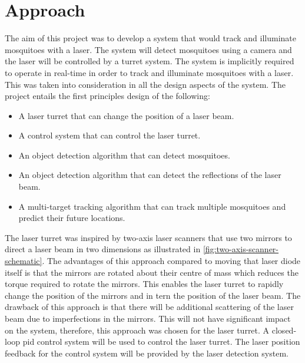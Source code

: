 
\section{Approach}
The aim of this project was to develop a system that would track and  illuminate mosquitoes with a laser. The system will detect mosquitoes using a camera and the laser will be controlled by a turret system. The system is implicitly required to operate in real-time in order to track and illuminate mosquitoes with a laser. This was taken into consideration in all the design aspects of the system. The project entails the first principles design of the following:
\begin{itemize}
  \item A laser turret that can change the position of a laser beam.
  \item A control system that can control the laser turret.
  \item An object detection algorithm that can detect mosquitoes.
  \item An object detection algorithm that can detect the reflections of the laser beam.
  \item A multi-target tracking algorithm that can track multiple mosquitoes and predict their future locations.
\end{itemize}

The laser turret was inspired by two-axis laser scanners that use two mirrors to direct a laser beam in two dimensions as illustrated in \autoref{fig:two-axis-scanner-schematic}. The advantages of this approach compared to moving that laser diode itself is that the mirrors are rotated about their centre of mass which reduces the torque required to rotate the mirrors. This enables the laser turret to rapidly change the position of the mirrors and in tern the position of the laser beam. The drawback of this approach is that there will be additional scattering of the laser beam due to imperfections in the mirrors. This will not have significant impact on the system, therefore, this approach was chosen for the laser turret. A closed-loop \gls{pid} control system will be used to control the laser turret. The laser position feedback for the control system will be provided by the laser detection system.

